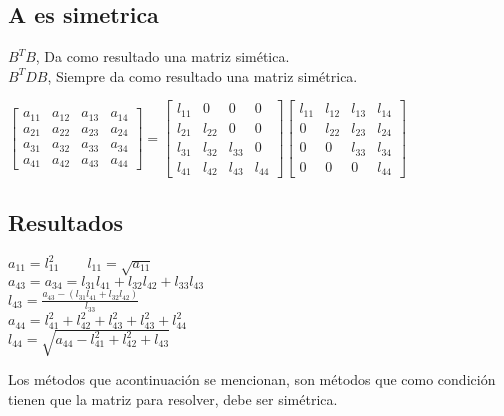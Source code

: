 \subsection*{A es simetrica}
$B^TB$, Da como resultado una matriz sim\'etica. \\
$B^TDB$, Siempre da como resultado una matriz sim\'etrica.
\begin{center}
$\begin{bmatrix}
a_{11} & a_{12} & a_{13} & a_{14} \\
a_{21} & a_{22} & a_{23} & a_{24} \\
a_{31} & a_{32} & a_{33} & a_{34} \\
a_{41} & a_{42} & a_{43} & a_{44} 
\end{bmatrix}=\begin{bmatrix}
l_{11} & 0 & 0 & 0 \\
l_{21} & l_{22} & 0 & 0 \\
l_{31} & l_{32} & l_{33} & 0 \\
l_{41} & l_{42} & l_{43} & l_{44} 
\end{bmatrix}\begin{bmatrix}
l_{11} & l_{12} & l_{13} & l_{14} \\
0 & l_{22} & l_{23} & l_{24} \\
0 & 0 & l_{33} & l_{34} \\
0 & 0 & 0 & l_{44} 
\end{bmatrix} $
\end{center}
\subsection*{Resultados}
\begin{center}
$a_{11}=l_{11}^2 \qquad l_{11}=\sqrt{a_{11}}$\\
$a_{43}=a_{34}=l_{31}l_{41}+l_{32}l_{42}+l_{33}l_{43}$\\
$l_{43}=\frac{a_{43}-(l_{31}l_{41}+l_{32}l_{42})}{l_{33}}$ \\
$a_{44}=l_{41}^2+l_{42}^2+l_{43}^2+l_{43}^2+l_{44}^2$ \\
$l_{44}=\sqrt{a_{44}-l_{41}^2+l_{42}^2+l_{43}} $ \\
\end{center}
Los m\'etodos que acontinuación se mencionan, son m\'etodos que como condici\'on tienen que la matriz para resolver, debe ser sim\'etrica.
